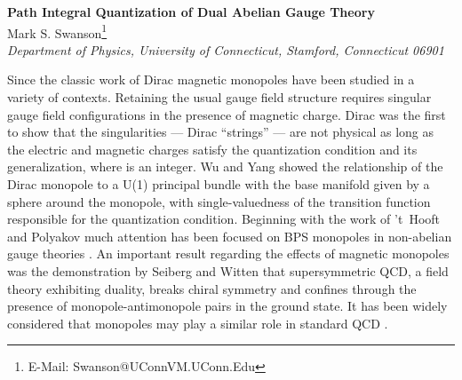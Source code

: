 \documentclass[a4paper,a4paper]{article}
\begin{document}
\large

\begin{center} {\Large \bf Path Integral Quantization of Dual Abelian Gauge Theory} \\
\vspace{2ex}
Mark S. Swanson\footnote{E-Mail: Swanson@UConnVM.UConn.Edu} \\

{\it Department of Physics, University of Connecticut, Stamford, Connecticut 06901}
\end{center}

\begin{abstract}
The path integral for 3+1 abelian gauge theory is rewritten in terms of a real antisymmetric field allowing a dual action that couples the electric and magnetic currents to the photon and each other in a gauge invariant manner.  Standard perturbative abelian quantum electrodynamics reemerges when the monopole current vanishes. For certain simple relationships between the monopole current and the electric current, the altered photon propagator can exhibit abelian charge confinement or develop mass, modeling effects believed to be present in non-abelian theories. 
\end{abstract}

\vspace{3ex}

Since the classic work of Dirac \cite{Dirac} magnetic monopoles have been studied in a variety of contexts.  Retaining the usual gauge field structure requires singular gauge field configurations in the presence of magnetic charge.  Dirac was the first to show that the singularities --- Dirac ``strings'' --- are not physical as long as the electric and magnetic charges satisfy the quantization condition \coordHE{} and its generalization, where \coordHE{} is an integer.  Wu and Yang \cite{WuYang} showed the relationship of the Dirac monopole to a U(1) principal bundle with the base manifold given by a sphere around the monopole, with single-valuedness of the transition function responsible for the quantization condition.  Beginning with the work of 't~Hooft and Polyakov \cite{tHooftPolyakov} much attention has been focused on BPS monopoles in non-abelian gauge theories \cite{Harvey}.  An important result regarding the effects of magnetic monopoles was the demonstration by Seiberg and Witten \cite{SeibergWitten} that \coordHE{} supersymmetric QCD, a field theory exhibiting duality, breaks chiral symmetry and confines through the presence of monopole-antimonopole pairs in the ground state. It has been widely considered that monopoles may play a similar role in standard QCD \cite{tHooftBruckmann}.
\end{document}
